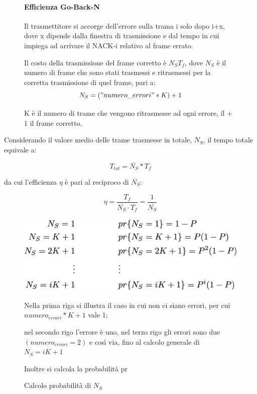 \begin{figure}[htbp]
\begin{minipage}{0.5\textwidth}
        \paragraph{Efficienza Go-Back-N}
        Il trasmettitore si accorge dell'errore sulla trama i solo dopo i+x, dove x dipende dalla finestra di trasmissione e dal tempo in cui impiega ad arrivare il NACK-i relativo al frame errato.

        Il costo della trasmissione del frame corretto è $N_ST_f$, dove $N_S$ è il numero di frame che sono stati trasmessi e ritrasmessi per la corretta trasmissione di quel frame, pari a:
        \begin{equation}
        N_S = ("numero\_errori" * K) + 1
        \end{equation}

        K è il numero di trame che vengono ritrasmesse ad ogni errore, il + 1 il frame corretto.

    \end{minipage}
\end{figure}

Considerando il valore medio delle trame trasmesse in totale, $N_S$, il tempo totale equivale a:
        
        \begin{equation}
        T_{tot} = \overline{N_S} * T_f 
        \end{equation}
        
        da cui l'efficienza $\eta$ è pari al reciproco di $\overline{N_S}$:

        \begin{equation}
        \eta = \frac{T_f}{\overline{N_S} \cdot T_f} = \frac{1}{\overline{N_S}}
        \end{equation}

        \begin{figure}[htbp]
            \centering
            \begin{minipage}{0.4\textwidth}
                \includegraphics[width=\linewidth]{images/gbnns.png}
                \caption{Calcolo probabilità di $N_S$}
            \end{minipage}%
            \hfill
            \begin{minipage}{0.55\textwidth}
                Nella prima riga si illustra il caso in cui non ci siano errori, per cui $numero_{errori}*K + 1$ vale 1;

                nel secondo rigo l'errore è uno, nel terzo rigo gli errori sono due$(numero_{errori} = 2)$ e così via, fino al calcolo generale di $N_S = iK + 1$

                Inoltre si calcola la probabilità pr 
            \end{minipage}
        \end{figure}

